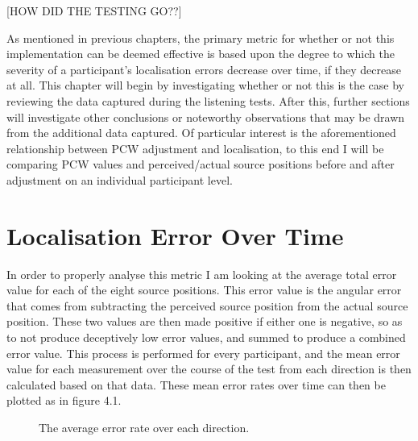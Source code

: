 [HOW DID THE TESTING GO??]

As mentioned in previous chapters, the primary metric for whether or not this implementation can be deemed effective is based upon the degree to which the severity of a participant's localisation errors decrease over time, if they decrease at all. This chapter will begin by investigating whether or not this is the case by reviewing the data captured during the listening tests. After this, further sections will investigate other conclusions or noteworthy observations that may be drawn from the additional data captured. Of particular interest is the aforementioned relationship between PCW adjustment and localisation, to this end I will be comparing PCW values and perceived/actual source positions before and after adjustment on an individual participant level.

\section{Localisation Error Over Time}
In order to properly analyse this metric I am looking at the average total error value for each of the eight source positions. This error value is the angular error that comes from subtracting the perceived source position from the actual source position. These two values are then made positive if either one is negative, so as to not produce deceptively low error values, and summed to produce a combined error value. This process is performed for every participant, and the mean error value for each measurement over the course of the test from each direction is then calculated based on that data. These mean error rates over time can then be plotted as in figure 4.1. 

\begin{figure}
	\caption{The average error rate over each direction.}
\end{figure}

